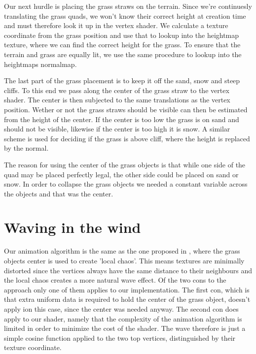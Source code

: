 
Our next hurdle is placing the grass straws on the terrain. Since
we're continuesly translating the grass quads, we won't know their
correct height at creation time and must therefore look it up in the
vertex shader. We calculate a texture coordinate from the grass
position and use that to lookup into the heightmap texture, where we
can find the correct height for the grass. To ensure that the terrain
and grass are equally lit, we use the same procedure to
lookup into the heightmaps normalmap.


The last part of the grass placement is to keep it off the sand, snow
and steep cliffs. To this end we pass along the center of the grass
straw to the vertex shader. The center is then subjected to the same
translations as the vertex position. Wether or not the grass straws
should be visible can then be estimated from the height of the
center. If the center is too low the grass is on sand and should not
be visible, likewise if the center is too high it is snow. A similar
scheme is used for deciding if the grass is above cliff, where the
height is replaced by the normal.

The reason for using the center of the grass objects is that while one
side of the quad may be placed perfectly legal, the other side could
be placed on sand or snow. In order to collapse the grass objects we
needed a constant variable across the objects and that was the center.


\section{Waving in the wind}

Our animation algorithm is the same as the one proposed in
, where the grass objects center is
used to create 'local chaos'. This means textures are minimally
distorted since the vertices always have the same distance to their
neighbours and the local chaos creates a more natural wave effect. Of
the two cons to the approach only one of them applies to our
implementation. The first con, which is that extra uniform data is
required to hold the center of the grass object, doesn't apply ion
this case, since the center was needed anyway. The second con does
apply to our shader, namely that the complexity of the animation
algorithm is limited in order to minimize the cost of the shader. The
wave therefore is just a simple cosine function applied to the two top
vertices, distinguished by their texture coordinate.


